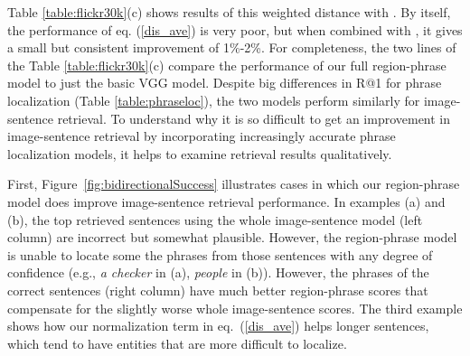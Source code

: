 \documentclass[twocolumn]{svjour3}
\begin{document}
Table \ref{table:flickr30k}(c) shows results of this weighted distance with . By itself, the performance of eq. (\ref{dis_ave}) is very poor, but when combined with , it gives a small but consistent improvement of 1\%-2\%. For completeness, the two lines of the Table \ref{table:flickr30k}(c) compare the performance of our full region-phrase model to just the basic VGG model. Despite big differences in R@1 for phrase localization (Table \ref{table:phraseloc}), the two models perform similarly for image-sentence retrieval. To understand why it is so difficult to get an improvement in image-sentence retrieval by incorporating increasingly accurate phrase localization models, it helps to examine retrieval results qualitatively. 

First, Figure~\ref{fig:bidirectionalSuccess} illustrates cases in which our region-phrase model does improve image-sentence retrieval performance.  In examples (a) and (b), the top retrieved sentences using the whole image-sentence model (left column) are incorrect but somewhat plausible.  However, the region-phrase model is unable to locate some the phrases from those sentences with any degree of confidence (e.g., {\em a checker} in (a), {\em people} in (b)).  However, the phrases of the correct sentences (right column) have much better region-phrase scores that compensate for the slightly worse whole image-sentence scores. The third example shows how our normalization term in eq.~(\ref{dis_ave}) helps longer sentences, which tend to have entities that are more difficult to localize.
\end{document}
